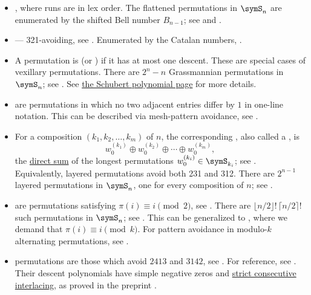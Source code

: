\begin{itemize}
\item {}, where runs are in lex order.
The flattened permutations in $\symS_n$ are enumerated by the shifted Bell
number $B_{n-1}$; see  and
\cite[Prop.~16]{NabawandaRakotondrajaoBamunoba2020}.

\item {} --- 321-avoiding, see
\cite{BilleyJockuschStanley1993,GunawanPanRussellTenner2022x}.
Enumerated by the Catalan numbers, .

\item A permutation is  (or ) if it has
at most one descent.
These are special cases of vexillary permutations.
There are $2^n-n$ Grassmannian permutations in $\symS_n$; see
.  See
\hyperref[grassmannianPermutation]{the Schubert polynomial page} for more
details.

\item {} are permutations in which no two adjacent
entries differ by $1$ in one-line notation.
This can be described via mesh-pattern avoidance, see .

\item For a composition $(k_1,k_2,\dotsc,k_m)$ of $n$, the corresponding
, also called a , is
\[
  w_0^{(k_1)}\oplus w_0^{(k_2)}\oplus\dotsb\oplus w_0^{(k_m)},
\]
the \hyperref[directSumPermutations]{direct sum} of the longest permutations
$w_0^{(k_i)}\in\symS_{k_i}$; see \cite{MerzonSmirnov2015}.
Equivalently, layered permutations avoid both 231 and 312.  There are
$2^{n-1}$ layered permutations in $\symS_n$, one for every composition of
$n$; see .

\item {} are permutations satisfying
$\pi(i)\equiv i\pmod 2$, see \cite{KebedeRakotondrajao2021}.
There are $\lfloor n/2\rfloor!\,\lceil n/2\rceil!$ such permutations in
$\symS_n$; see .
This can be generalized to ,
where we demand that $\pi(i) \equiv i \pmod k$.
For pattern avoidance in modulo-$k$ alternating permutations, see
\cite{AlexanderssonFufaGetachewQiu2022x}.

\item {} permutations\label{permSeparable}
are those which avoid $2413$ and $3142$,
see .
For reference, see \cite{West1995}.
Their descent polynomials have simple negative zeros and
\hyperref[separableDescentRealRooted]{strict consecutive interlacing},
as proved in the preprint \cite{Zhang2026SeparableInterlacing}.


\end{itemize}
